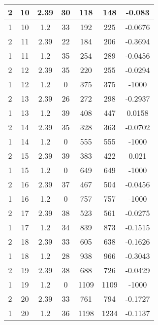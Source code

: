\documentclass[letterpaper, 12pt]{article}
\begin{document}
\begin{longtable}{|c|c|c|c|c|c|c|}
\hline
2 & 10 & 2.39 & 30 & 118 & 148 & -0.083 \\
\hline
1 & 10 & 1.2 & 33 & 192 & 225 & -0.0676 \\
\hline
2 & 11 & 2.39 & 22 & 184 & 206 & -0.3694 \\
\hline
1 & 11 & 1.2 & 35 & 254 & 289 & -0.0456 \\
\hline
2 & 12 & 2.39 & 35 & 220 & 255 & -0.0294 \\
\hline
1 & 12 & 1.2 & 0 & 375 & 375 & -1000 \\
\hline
2 & 13 & 2.39 & 26 & 272 & 298 & -0.2937 \\
\hline
1 & 13 & 1.2 & 39 & 408 & 447 & 0.0158 \\
\hline
2 & 14 & 2.39 & 35 & 328 & 363 & -0.0702 \\
\hline
1 & 14 & 1.2 & 0 & 555 & 555 & -1000 \\
\hline
2 & 15 & 2.39 & 39 & 383 & 422 & 0.021 \\
\hline
1 & 15 & 1.2 & 0 & 649 & 649 & -1000 \\
\hline
2 & 16 & 2.39 & 37 & 467 & 504 & -0.0456 \\
\hline
1 & 16 & 1.2 & 0 & 757 & 757 & -1000 \\
\hline
2 & 17 & 2.39 & 38 & 523 & 561 & -0.0275 \\
\hline
1 & 17 & 1.2 & 34 & 839 & 873 & -0.1515 \\
\hline
2 & 18 & 2.39 & 33 & 605 & 638 & -0.1626 \\
\hline
1 & 18 & 1.2 & 28 & 938 & 966 & -0.3043 \\
\hline
2 & 19 & 2.39 & 38 & 688 & 726 & -0.0429 \\
\hline
1 & 19 & 1.2 & 0 & 1109 & 1109 & -1000 \\
\hline
2 & 20 & 2.39 & 33 & 761 & 794 & -0.1727 \\
\hline
1 & 20 & 1.2 & 36 & 1198 & 1234 & -0.1137 \\
\hline
\end{longtable}
\end{document}
